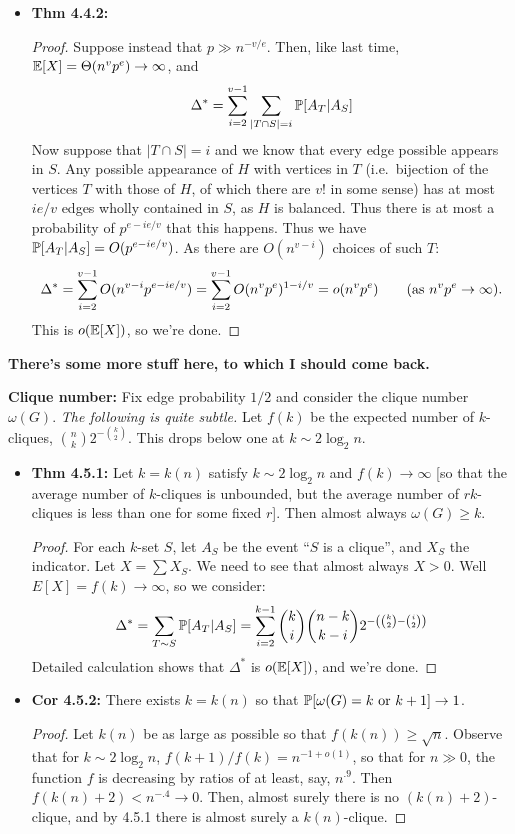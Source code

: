 \documentclass[11pt]{article}
\newenvironment{INT}[1][]{\begin{itemize}\small\item\textbf{#1}}{\end{itemize}}
\newcommand{\moreINT}[1][]{\item\textbf{#1}}
\begin{document}
\begin{chapter4}
\begin{itemise}
\begin{INT}[Thm 4.4.2:]
\begin{proof}
\INDENT Suppose instead that $p\gg n^{-v/e}$. Then, like last time, $\operatorname{\mathbb{E}}[X]=\Theta(n^vp^e)\rightarrow\infty$, and
\[\Delta^*=\sum_{i=2}^{v-1}\sum_{|T\cap S|=i}\operatorname{\mathbb{P}}[A_T|A_S]\]
Now suppose that $|T\cap S|=i$ and we know that every edge possible appears in $S$. Any possible appearance of $H$ with vertices in $T$ (i.e.\ bijection of the vertices $T$ with those of $H$, of which there are $v!$ in some sense) has at most $ie/v$ edges wholly contained in $S$, as $H$ is balanced. Thus there is at most a probability of $p^{e-ie/v}$ that this happens. Thus we have $\operatorname{\mathbb{P}}[A_T|A_S]=O(p^{e-ie/v})$. As there are $O(n^{v-i})$ choices of such $T$:
\[\Delta^*=\sum_{i=2}^{v-1}O(n^{v-i}p^{e-ie/v})=\sum_{i=2}^{v-1}O(n^{v}p^{e})^{1-i/v}=o(n^vp^e)\text{\qquad(as $n^vp^e\rightarrow\infty$).}\]
This is $o(\operatorname{\mathbb{E}}[X])$, so we're done.
\end{proof}
\end{INT}
\item \textbf{There's some more stuff here, to which I should come back.}
\item \textbf{Clique number:} Fix edge probability $1/2$ and consider the clique number $\omega(G)$. \textit{The following is quite subtle.} Let $f(k)$ be the expected number of $k$-cliques, ${n\choose k}2^{-{k\choose2}}$. This drops below one at $k\sim 2\log_2n$.
\begin{INT}[Thm 4.5.1:] Let $k=k(n)$ satisfy $k\sim 2\log_2n$ and $f(k)\rightarrow\infty$ [so that the average number of $k$-cliques is unbounded, but the average number of $rk$-cliques is less than one for some fixed $r$]. Then almost always $\omega(G)\geq k$.
\begin{proof}
For each $k$-set $S$, let $A_S$ be the event ``$S$ is a clique'', and $X_S$ the indicator. Let $X=\sum X_S$. We need to see that almost always $X>0$. Well $E[X]=f(k)\rightarrow\infty$, so we consider:
\[\Delta^*=\sum_{T\sim S}\operatorname{\mathbb{P}}[A_T|A_S]=\sum_{i=2}^{k-1}{k\choose i}{n-k\choose k-i}2^{-\left({k\choose2}-{i\choose2}\right)}\]
Detailed calculation shows that $\Delta^*$ is $o(\operatorname{\mathbb{E}}[X])$, and we're done.
\end{proof}
\moreINT[Cor 4.5.2:] There exists $k=k(n)$ so that $\operatorname{\mathbb{P}}[\omega(G)=k\textup{ or }k+1]\rightarrow1$.
\begin{proof}
Let $k(n)$ be as large as possible so that $f(k(n))\geq\sqrt n$. Observe that for $k\sim 2\log_2 n$, $f(k+1)/f(k)=n^{-1+o(1)}$, so that for $n\gg0$, the function $f$ is decreasing by ratios of at least, say, $n^{.9}$. Then $f(k(n)+2)<n^{-.4}\rightarrow0$. Then, almost surely there is no $(k(n)+2)$-clique, and by 4.5.1 there is almost surely a $k(n)$-clique.

\end{proof}
\end{INT}
\end{itemise}
\end{chapter4}
\end{document}

